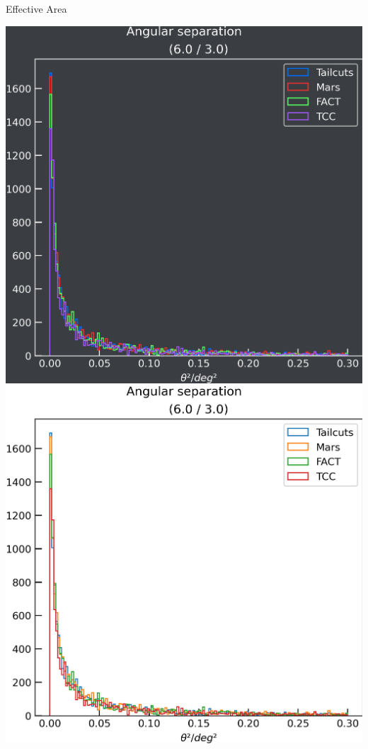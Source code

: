 \begin{frame}{Effective Area}
\begin{minipage}{0.32\textwidth}
    \fi
  \end{minipage}
  \begin{minipage}{0.32\textwidth}
    \ifdefined\darktheme
      \centering
      \includegraphics[width=\textwidth]{plots/ang_sep/ang_sep__6.0_3.0_dark.png}
    \else
      \centering
      \includegraphics[width=\textwidth]{plots/ang_sep/ang_sep__6.0_3.0_light.png}

\end{minipage}
\end{frame}
